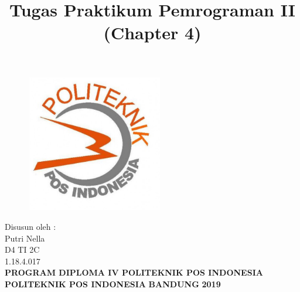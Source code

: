 \documentclass[a4paper, 12pt]{article}
\begin{document}
\title{\huge\textbf{Tugas Praktikum Pemrograman II (Chapter 4)}}
\date{}

\maketitle


\begin{figure}[!ht]
\begin{center}
\includegraphics[width = 6cm, height = 6cm]{poltekpos.jpg}
\end{center}
\end{figure}

\begin{center}
\vspace{1cm}
Disusun oleh :\\
Putri Nella\\
D4 TI 2C\\
1.18.4.017\\
\vspace{1cm}
\textbf{PROGRAM DIPLOMA IV POLITEKNIK POS INDONESIA} \linebreak
\textbf{POLITEKNIK POS INDONESIA} \linebreak
\textbf{BANDUNG}\linebreak
\textbf{2019}

\end{center}


\thispagestyle{empty}


\end{document}
